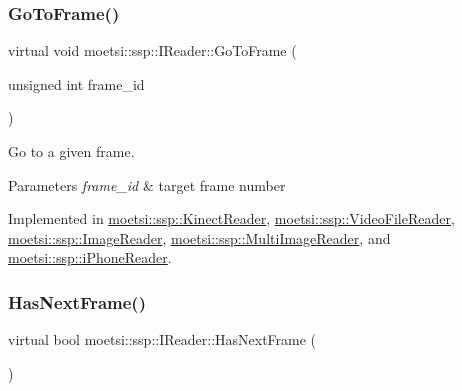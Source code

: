 \mbox{\label{classmoetsi_1_1ssp_1_1IReader_a6f1be3c06538992cca6d550bd9566681}} 
\subsubsection{\texorpdfstring{Go\+To\+Frame()}{GoToFrame()}\hspace{0.1cm}{\footnotesize\ttfamily [2/2]}}
{\footnotesize\ttfamily virtual void moetsi\+::ssp\+::\+I\+Reader\+::\+Go\+To\+Frame (\begin{DoxyParamCaption}\item[{unsigned int}]{frame\+\_\+id }\end{DoxyParamCaption})\hspace{0.3cm}{\ttfamily [pure virtual]}}



Go to a given frame. 


\begin{DoxyParams}{Parameters}
{\em frame\+\_\+id} & target frame number \\
\hline
\end{DoxyParams}


Implemented in \hyperlink{classmoetsi_1_1ssp_1_1KinectReader_a315690c46e153a35d4ded1189e93af08}{moetsi\+::ssp\+::\+Kinect\+Reader}, \hyperlink{classmoetsi_1_1ssp_1_1VideoFileReader_ad98a532db8b1e2c3879df274b2efb082}{moetsi\+::ssp\+::\+Video\+File\+Reader}, \hyperlink{classmoetsi_1_1ssp_1_1ImageReader_a32eb88cc612e6920f4910e0803b0ce3c}{moetsi\+::ssp\+::\+Image\+Reader}, \hyperlink{classmoetsi_1_1ssp_1_1MultiImageReader_a7c552a1ad469660ea0a88b9ca85138ad}{moetsi\+::ssp\+::\+Multi\+Image\+Reader}, and \hyperlink{classmoetsi_1_1ssp_1_1iPhoneReader_a27b6dea97e4c4db8e4e749cc9e30e7ca}{moetsi\+::ssp\+::i\+Phone\+Reader}.

\mbox{\label{classmoetsi_1_1ssp_1_1IReader_af9186ba41e136dc4ec3242b5dd55fa04}} 
\subsubsection{\texorpdfstring{Has\+Next\+Frame()}{HasNextFrame()}\hspace{0.1cm}{\footnotesize\ttfamily [1/2]}}
{\footnotesize\ttfamily virtual bool moetsi\+::ssp\+::\+I\+Reader\+::\+Has\+Next\+Frame (\begin{DoxyParamCaption}{ }\end{DoxyParamCaption})\hspace{0.3cm}{\ttfamily [pure virtual]}}



